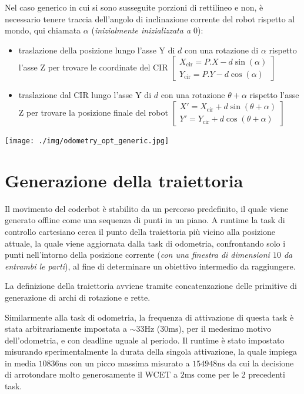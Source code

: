 \documentclass[11pt]{article}
\begin{document}
Nel caso generico in cui si sono susseguite porzioni di rettilineo e non, è necessario tenere traccia dell'angolo di inclinazione corrente del robot rispetto al mondo, qui chiamata \(\alpha\) (\emph{inizialmente inizializzata a \(0\)}):
\begin{itemize}
\item traslazione della posizione lungo l'asse Y di \(d\) con una rotazione di \(\alpha\) rispetto l'asse Z per trovare le coordinate del CIR \(\begin{bmatrix}X_\text{cir}=P.X-d\sin(\alpha)\\Y_\text{cir}=P.Y-d\cos(\alpha)\end{bmatrix}\)
\item traslazione dal CIR lungo l'asse Y di \(d\) con una rotazione \(\theta+\alpha\) rispetto l'asse Z per trovare la posizione finale del robot \(\begin{bmatrix}X'=X_\text{cir}+d\sin(\theta+\alpha)\\Y'=Y_\text{cir}+d\cos(\theta+\alpha)\end{bmatrix}\)
\end{itemize}
\begin{center}
\texttt{[image: ./img/odometry\_opt\_generic.jpg]}
\end{center}
\section{Generazione della traiettoria}
\label{sec:orgb8a0eec}
Il movimento del coderbot è stabilito da un percorso predefinito, il quale viene generato offline come una sequenza di punti in un piano. A runtime la task di controllo cartesiano cerca il punto della traiettoria più vicino alla posizione attuale, la quale viene aggiornata dalla task di odometria, confrontando solo i punti nell'intorno della posizione corrente (\emph{con una finestra di dimensioni \(10\) da entrambi le parti}), al fine di determinare un obiettivo intermedio da raggiungere.

La definizione della traiettoria avviene tramite concatenzazione delle primitive di generazione di archi di rotazione e rette.

Similarmente alla task di odometria, la frequenza di attivazione di questa task è stata arbitrariamente impostata a \(\sim 33\text{Hz}\) (\(30\text{ms}\)), per il medesimo motivo dell'odometria, e con deadline uguale al periodo. Il runtime è stato impostato misurando sperimentalmente la durata della singola attivazione, la quale impiega in media \(10836\text{ns}\) con un picco massima misurato a \(154948\text{ns}\) da cui la decisione di arrotondare molto generosamente il WCET a \(2\text{ms}\) come per le 2 precedenti task.
\end{document}
